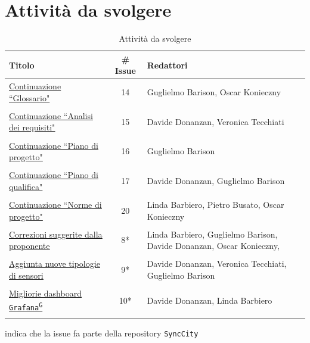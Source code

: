 \documentclass[8pt]{article}
\newcommand{\glossterm}[1]{#1\textsuperscript{G}} %
\begin{document}
\section{Attività da svolgere}
\begin{table}[ht!]
	\centering
	\begin{tabular}{p{7cm}cp{7cm}}
		\toprule
		\textbf{Titolo} & \textbf{\# Issue} & \textbf{Redattori} \\
		\midrule
		\href{https://github.com/NaN1fy/docs/issues/14}{\underline{Continuazione ``Glossario"}} & 14 & Guglielmo Barison, Oscar Konieczny\\\\
		\href{https://github.com/NaN1fy/docs/issues/15}{\underline{Continuazione ``Analisi dei requisiti"}} & 15 & Davide Donanzan, Veronica Tecchiati\\\\
		\href{https://github.com/NaN1fy/docs/issues/16}{\underline{Continuazione ``Piano di progetto"}}  & 16 & Guglielmo Barison\\\\
		\href{https://github.com/NaN1fy/docs/issues/17}{\underline{Continuazione ``Piano di qualifica"}} & 17 & Davide Donanzan, Guglielmo Barison\\\\
		\href{https://github.com/NaN1fy/docs/issues/20}{\underline{Continuazione ``Norme di progetto"}} & 20 & Linda Barbiero, Pietro Busato, Oscar Konieczny\\\\
        \href{https://github.com/NaN1fy/SyncCity/issues/8}{\underline{Correzioni suggerite dalla proponente}} & 8*\tnote{*} & Linda Barbiero, Guglielmo Barison, Davide Donanzan, Oscar Konieczny, \\\\
        \href{https://github.com/NaN1fy/SyncCity/issues/9}{\underline{Aggiunta nuove tipologie di sensori}} & 9*\tnote{*} & Davide Donanzan, Veronica Tecchiati, Guglielmo Barison\\\\
		\href{https://github.com/NaN1fy/SyncCity/issues/10}{\underline{Migliorie dashboard \texttt{\glossterm{Grafana}}}} & 10*\tnote{*} & Davide Donanzan, Linda Barbiero\\\\
		\bottomrule
	\end{tabular}
	\begin{tablenotes}
		\vspace{1em}
		\item * indica che la issue fa parte della repository \texttt{SyncCity}
	\end{tablenotes}
	\caption{Attività da svolgere}
	\label{table:Attivita da svolgere}
\end{table}
\end{document}
